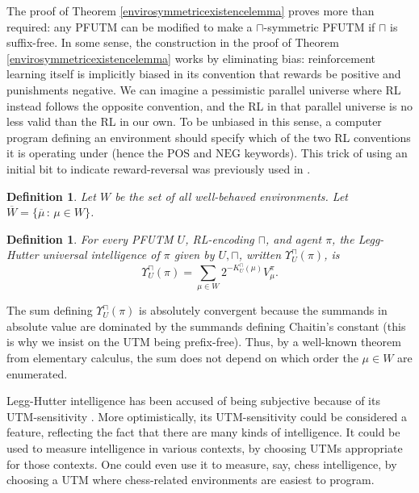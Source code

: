 \documentclass[runningheads]{llncs}
\newtheorem{mydefinition}[mytheorem]{Definition}
\newtheorem{mylemma}[mytheorem]{Lemma}
\def\LH{\Upsilon}
\begin{document}
The proof of Theorem \ref{envirosymmetricexistencelemma} proves more than required:
any PFUTM can be modified to make a $\sqcap$-symmetric PFUTM
if $\sqcap$ is suffix-free. In some sense,
the construction in the proof of Theorem \ref{envirosymmetricexistencelemma} works
by eliminating bias: reinforcement learning itself is implicitly biased in its
convention that rewards be positive and punishments negative. We can imagine
a pessimistic parallel universe
where RL instead follows the opposite convention, and the
RL in that parallel universe is no less valid than the RL in our own. To be
unbiased in this sense, a computer program defining an environment
should specify which of the two RL conventions it is operating under (hence the
$\mathrm{POS}$ and $\mathrm{NEG}$ keywords). This trick of using an initial bit
to indicate reward-reversal was previously used in \cite{legg2013approximation}.

\begin{mydefinition}
    Let $W$ be the set of all well-behaved environments.
    Let $\overline W=\{\overline\mu\,:\,\mu\in W\}$.
\end{mydefinition}



\begin{mydefinition}
\label{universalintelligencedefn}
For every PFUTM $U$, RL-encoding $\sqcap$, and agent $\pi$,
the \emph{Legg-Hutter universal intelligence of $\pi$ given
by $U,\sqcap$}, written $\LH^\sqcap_U(\pi)$, is
\[
    \LH^\sqcap_U(\pi) = \sum_{\mu \in W} 2^{-K^\sqcap_U(\mu)}V^\pi_\mu.
\]
\end{mydefinition}

The sum defining $\LH^\sqcap_U(\pi)$ is absolutely convergent because the summands
in absolute value are dominated by the summands defining Chaitin's constant
(this is why we insist on the UTM being prefix-free).
Thus, by a well-known
theorem from elementary calculus, the sum does not depend on which order the $\mu\in W$
are enumerated.

Legg-Hutter intelligence has been accused of being subjective
because of its
UTM-sensitivity \cite{leike2015bad} \cite{hernandez2015c} \cite{hibbard2009bias}.
More optimistically,
its UTM-sensitivity could be considered a feature, reflecting the fact
that there are many kinds of intelligence. It could be used to measure
intelligence in various contexts, by choosing UTMs appropriate for those
contexts. One could even use it to measure, say, chess intelligence,
by choosing a UTM where chess-related environments are easiest to program.
\end{document}
